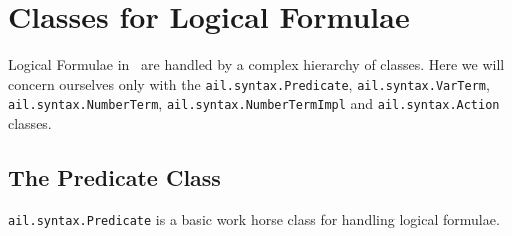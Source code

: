 \section{Classes for Logical Formulae}
\label{s:formulas}

\begin{sloppypar}
Logical Formulae in \ail\ are handled by a complex hierarchy of classes.  Here we will concern ourselves only with the \texttt{ail.syntax.Predicate}, \texttt{ail.syntax.VarTerm}, \texttt{ail.syntax.NumberTerm}, \texttt{ail.syntax.NumberTermImpl} and \texttt{ail.syntax.Action} classes.
\end{sloppypar}

\subsection{The Predicate Class}
\texttt{ail.syntax.Predicate} is a basic work horse class for handling logical formulae.

